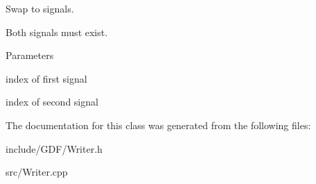 Swap to signals. 

Both signals must exist. 
\begin{DoxyParams}{Parameters}
\item[\mbox{\tt[in]} {\em a}]index of first signal \item[\mbox{\tt[in]} {\em b}]index of second signal \end{DoxyParams}


The documentation for this class was generated from the following files:\begin{DoxyCompactItemize}
\item 
include/GDF/Writer.h\item 
src/Writer.cpp\end{DoxyCompactItemize}
